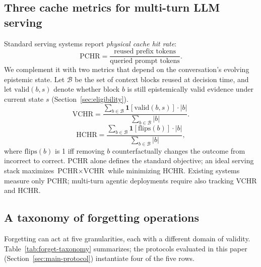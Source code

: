 \documentclass{article}
\begin{document}
\subsection{Three cache metrics for multi-turn LLM serving}
\label{sec:metrics}
Standard serving systems report \emph{physical cache hit rate}:
\begin{equation}
\text{PCHR} = \frac{\text{reused prefix tokens}}{\text{queried prompt tokens}}.
\end{equation}
We complement it with two metrics that depend on the conversation's evolving epistemic state. Let $\mathcal{B}$ be the set of context blocks reused at decision time, and let $\text{valid}(b, s)$ denote whether block $b$ is still epistemically valid evidence under current state $s$ (Section~\ref{sec:eligibility}).
\begin{equation}
\text{VCHR} = \frac{\sum_{b \in \mathcal{B}} \mathbf{1}[\text{valid}(b, s)] \cdot |b|}{\sum_{b \in \mathcal{B}} |b|}.
\end{equation}
\begin{equation}
\text{HCHR} = \frac{\sum_{b \in \mathcal{B}} \mathbf{1}[\text{flips}(b)] \cdot |b|}{\sum_{b \in \mathcal{B}} |b|},
\end{equation}
where $\text{flips}(b)$ is 1 iff removing $b$ counterfactually changes the outcome from incorrect to correct. PCHR alone defines the standard objective; an ideal serving stack maximizes $\text{PCHR} \times \text{VCHR}$ while minimizing HCHR. Existing systems measure only PCHR; multi-turn agentic deployments require also tracking VCHR and HCHR.

\subsection{A taxonomy of forgetting operations}
\label{sec:taxonomy}
Forgetting can act at five granularities, each with a different domain of validity. Table~\ref{tab:forget-taxonomy} summarizes; the protocols evaluated in this paper (Section~\ref{sec:main-protocol}) instantiate four of the five rows.
\end{document}
